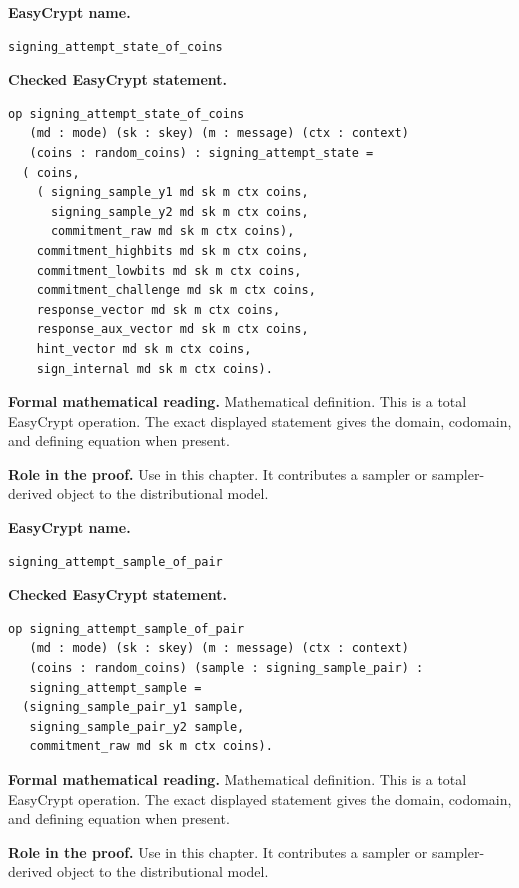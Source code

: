 \begin{formaldefinition}
\noindent\textbf{EasyCrypt name.}
\begin{lstlisting}[language=EasyCrypt,basicstyle=\ttfamily\scriptsize]
signing_attempt_state_of_coins
\end{lstlisting}
\noindent\textbf{Checked EasyCrypt statement.}
\begin{lstlisting}[language=EasyCrypt,basicstyle=\ttfamily\scriptsize]
op signing_attempt_state_of_coins
   (md : mode) (sk : skey) (m : message) (ctx : context)
   (coins : random_coins) : signing_attempt_state =
  ( coins,
    ( signing_sample_y1 md sk m ctx coins,
      signing_sample_y2 md sk m ctx coins,
      commitment_raw md sk m ctx coins),
    commitment_highbits md sk m ctx coins,
    commitment_lowbits md sk m ctx coins,
    commitment_challenge md sk m ctx coins,
    response_vector md sk m ctx coins,
    response_aux_vector md sk m ctx coins,
    hint_vector md sk m ctx coins,
    sign_internal md sk m ctx coins).
\end{lstlisting}
\noindent\textbf{Formal mathematical reading.}
Mathematical definition. This is a total EasyCrypt operation.  The exact displayed statement gives the domain, codomain, and defining equation when present.

\noindent\textbf{Role in the proof.}
Use in this chapter. It contributes a sampler or sampler-derived object to the distributional model.

\end{formaldefinition}

\begin{formaldefinition}
\noindent\textbf{EasyCrypt name.}
\begin{lstlisting}[language=EasyCrypt,basicstyle=\ttfamily\scriptsize]
signing_attempt_sample_of_pair
\end{lstlisting}
\noindent\textbf{Checked EasyCrypt statement.}
\begin{lstlisting}[language=EasyCrypt,basicstyle=\ttfamily\scriptsize]
op signing_attempt_sample_of_pair
   (md : mode) (sk : skey) (m : message) (ctx : context)
   (coins : random_coins) (sample : signing_sample_pair) :
   signing_attempt_sample =
  (signing_sample_pair_y1 sample,
   signing_sample_pair_y2 sample,
   commitment_raw md sk m ctx coins).
\end{lstlisting}
\noindent\textbf{Formal mathematical reading.}
Mathematical definition. This is a total EasyCrypt operation.  The exact displayed statement gives the domain, codomain, and defining equation when present.

\noindent\textbf{Role in the proof.}
Use in this chapter. It contributes a sampler or sampler-derived object to the distributional model.

\end{formaldefinition}

